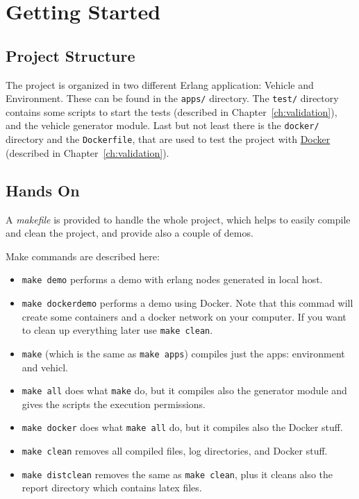 \documentclass{memoir}
\begin{document}
\section{Getting Started}
\subsection{Project Structure}
The project is organized in two different Erlang application: Vehicle and Environment. These can be found in the \verb|apps/| directory. The \verb|test/| directory contains some scripts to start the tests (described in Chapter~\ref{ch:validation}), and the vehicle generator module. Last but not least there is the \verb|docker/| directory and the \verb|Dockerfile|, that are used to test the project with \href{https://www.docker.com/}{Docker} (described in Chapter~\ref{ch:validation}).

\subsection{Hands On}
A \emph{makefile} is provided to handle the whole project, which helps to easily compile and clean the project, and provide also a couple of demos.

Make commands are described here:
\begin{itemize}
	\item \verb|make demo| performs a demo with erlang nodes generated in local host.
	\item \verb|make dockerdemo| performs a demo using Docker. Note that this commad will create some containers and a docker network on your computer. If you want to clean up everything later use \verb|make clean|.
	\item \verb|make| (which is the same as \verb|make apps|) compiles just the apps: environment and vehicl.
	\item \verb|make all| does what \verb|make| do, but it compiles also the generator module and gives the scripts the execution permissions.
	\item \verb|make docker| does what \verb|make all| do, but it compiles also the Docker stuff.
	\item  \verb|make clean| removes all compiled files, log directories, and Docker stuff.
	\item  \verb|make distclean| removes the same as \verb|make clean|, plus it cleans also the report directory which contains latex files.
\end{itemize}
\end{document}
